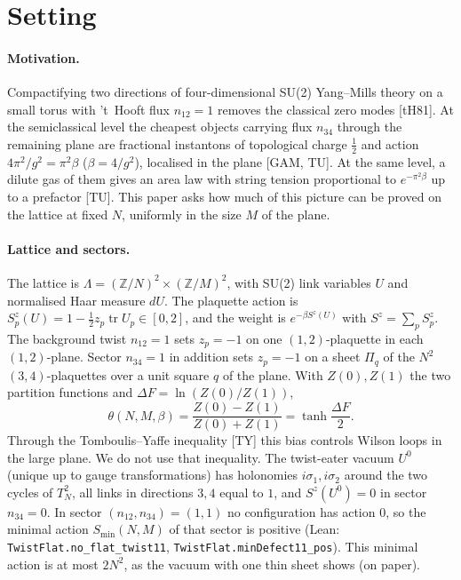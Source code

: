 \documentclass[11pt,a4paper]{article}
\theoremstyle{definition}
\theoremstyle{remark}
\newcommand{\tr}{\operatorname{tr}}
\newcommand{\code}[1]{\texttt{#1}}
\begin{document}
\section{Setting}\label{sec:setting}

\paragraph{Motivation.}
Compactifying two directions of four-dimensional SU(2) Yang--Mills theory on a small torus with 't~Hooft flux $n_{12}=1$ removes the classical zero modes [tH81].
At the semiclassical level the cheapest objects carrying flux $n_{34}$ through the remaining plane are fractional instantons of topological charge $\frac12$ and action $4\pi^2/g^2=\pi^2\beta$ ($\beta=4/g^2$), localised in the plane [GAM, TU].
At the same level, a dilute gas of them gives an area law with string tension proportional to $e^{-\pi^2\beta}$ up to a prefactor [TU].
This paper asks how much of this picture can be proved on the lattice at fixed $N$, uniformly in the size $M$ of the plane.

\paragraph{Lattice and sectors.}
The lattice is $\Lambda=(\mathbb{Z}/N)^2\times(\mathbb{Z}/M)^2$, with SU(2) link variables $U$ and normalised Haar measure $dU$.
The plaquette action is $S^z_p(U)=1-\frac12 z_p\tr U_p\in[0,2]$, and the weight is $e^{-\beta S^z(U)}$ with $S^z=\sum_pS^z_p$.
The background twist $n_{12}=1$ sets $z_p=-1$ on one $(1,2)$-plaquette in each $(1,2)$-plane.
Sector $n_{34}=1$ in addition sets $z_p=-1$ on a sheet $\Pi_q$ of the $N^2$ $(3,4)$-plaquettes over a unit square $q$ of the plane.
With $Z(0),Z(1)$ the two partition functions and $\Delta F=\ln(Z(0)/Z(1))$,
\[ \theta(N,M,\beta)=\frac{Z(0)-Z(1)}{Z(0)+Z(1)}=\tanh\frac{\Delta F}{2}. \]
Through the Tomboulis--Yaffe inequality [TY] this bias controls Wilson loops in the large plane.
We do not use that inequality.
The twist-eater vacuum $U^0$ (unique up to gauge transformations) has holonomies $i\sigma_1,i\sigma_2$ around the two cycles of $T^2_N$, all links in directions $3,4$ equal to $1$, and $S^z(U^0)=0$ in sector $n_{34}=0$.
In sector $(n_{12},n_{34})=(1,1)$ no configuration has action $0$, so the minimal action $S_{\min}(N,M)$ of that sector is positive (Lean: \code{TwistFlat.no\_flat\_twist11}, \code{TwistFlat.minDefect11\_pos}).
This minimal action is at most $2N^2$, as the vacuum with one thin sheet shows (on paper).
\end{document}
